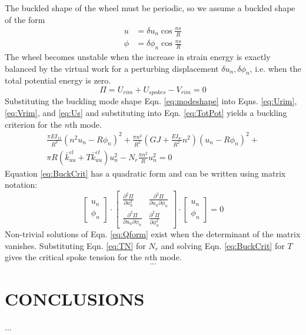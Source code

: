 \documentclass{bmd2016p}
\begin{document}
The buckled shape of the wheel must be periodic, so we assume a buckled shape of the form
	\begin{equation}\label{eq:modeshape}
	\begin{split}
	u &= \delta u_n \cos{\frac{ns}{R}} \\
	\phi &= \delta\phi_n \cos{\frac{ns}{R}}
	\end{split}
	\end{equation}
The wheel becomes unstable when the increase in strain energy is exactly balanced by the virtual work for a perturbing displacement $\delta u_n, \delta\phi_n$, i.e. when the total potential energy is zero.
	\begin{equation}\label{eq:TotPot}
	\Pi = U_{rim} + U_{spokes} - V_{rim} = 0
	\end{equation}
Substituting the buckling mode shape Eqn. \ref{eq:modeshape} into Eqns. \ref{eq:Urim}, \ref{eq:Vrim}, and \ref{eq:Us} and substituting into Eqn. \ref{eq:TotPot} yields a buckling criterion for the $n$th mode.
	\begin{multline}\label{eq:BuckCrit}
	\frac{\pi EI_{11}}{R^3}(n^2 u_n - R\phi_n)^2 + \frac{\pi n^2}{R^2}\left(GJ + \frac{EI_w}{R^2}n^2\right)(u_n-R\phi_n)^2 + \\
	\pi R(\bar{k}_{uu}^{el} + T\bar{k}_{uu}^{el})u_n^2 - N_r\frac{\pi n^2}{R}u_n^2=0
	\end{multline}
Equation \ref{eq:BuckCrit} has a quadratic form and can be written using matrix notation:
	\begin{equation}\label{eq:Qform}
	\begin{bmatrix}
	u_n\\\phi_n
	\end{bmatrix} \cdot
	\begin{bmatrix}
	\frac{\partial^2 \Pi}{\partial u_n^2} & \frac{\partial^2 \Pi}{\partial u_n \partial \phi_n}\\
	\frac{\partial^2 \Pi}{\partial u_n\partial\phi_n} & \frac{\partial^2 \Pi}{\partial \phi_n^2}
	\end{bmatrix} \cdot
	\begin{bmatrix}
	u_n\\\phi_n
	\end{bmatrix}
	=0
	\end{equation}
Non-trivial solutions of Eqn. \ref{eq:Qform} exist when the determinant of the matrix vanishes. Substituting Eqn. \ref{eq:TN} for $N_r$ and solving Eqn. \ref{eq:BuckCrit} for $T$ gives the critical spoke tension for the $n$th mode.
	\begin{equation}
	...
	\end{equation}



\section{CONCLUSIONS}

...



\end{document}
